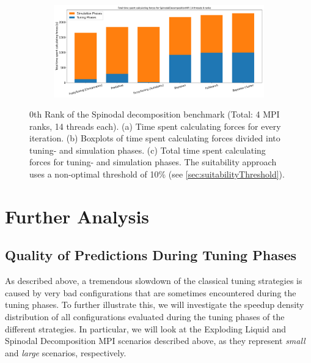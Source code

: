\begin{figure}[H]
    \begin{subfigure}[b]{\textwidth}
        \includegraphics[width=\columnwidth,trim={0cm 0.5cm 0cm 0.9cm},clip]{figures/Benchmark/SpinodalDecompositionMPI/SpinodalDecompositionMPI_timings_total_SpinodalDecompositionMPI_14_0.png}
        \caption{}
        \label{fig:spinodalTotalTime_14thread}
    \end{subfigure}


    \caption[Spinodal decomposition benchmark MPI with 14 threads]{0th Rank of the Spinodal decomposition benchmark (Total: 4 MPI ranks, 14 threads each). (a) Time spent calculating forces for every iteration. (b) Boxplots of time spent calculating forces divided into tuning- and simulation phases. (c) Total time spent calculating forces for tuning- and simulation phases. The suitability approach uses a non-optimal threshold of 10\% (see \autoref{sec:suitabilityThreshold}).}
    \label{fig:spinodal_14thread}
\end{figure}



\section{Further Analysis}

\subsection{Quality of Predictions During Tuning Phases}

As described above, a tremendous slowdown of the classical tuning strategies is caused by very bad configurations that are sometimes encountered during the tuning phases. To further illustrate this, we will investigate the speedup density distribution of all configurations evaluated during the tuning phases of the different strategies. In particular, we will look at the Exploding Liquid and Spinodal Decomposition MPI scenarios described above, as they represent \emph{small} and \emph{large} scenarios, respectively.

